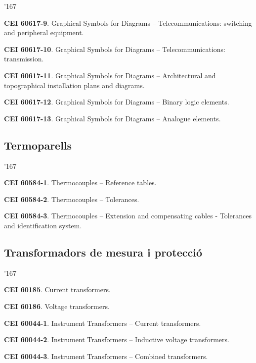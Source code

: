 \begin{dinglist}{'167}
     \item \textbf{CEI 60617-9}. Graphical Symbols for Diagrams -- Telecommunications: switching and peripheral equipment.
      \item \textbf{CEI 60617-10}. Graphical Symbols for Diagrams -- Telecommunications: transmission.
      \item \textbf{CEI 60617-11}. Graphical Symbols for Diagrams -- Architectural and topographical installation plans and diagrams.
      \item \textbf{CEI 60617-12}. Graphical Symbols for Diagrams -- Binary logic elements.
      \item \textbf{CEI 60617-13}. Graphical Symbols for Diagrams -- Analogue elements.
\end{dinglist}


\subsection*{Termoparells} 
\begin{dinglist}{'167}
    \item \textbf{CEI 60584-1}. Thermocouples -- Reference tables.
    \item \textbf{CEI 60584-2}. Thermocouples -- Tolerances.
    \item \textbf{CEI 60584-3}. Thermocouples -- Extension and compensating cables - Tolerances and identification system.
\end{dinglist}


\subsection*{Transformadors de mesura i protecci\'{o}}
\begin{dinglist}{'167}
    \item \textbf{CEI 60185}. Current transformers.
    \item \textbf{CEI 60186}. Voltage transformers.
    \item \textbf{CEI 60044-1}. Instrument Transformers -- Current transformers.
    \item \textbf{CEI 60044-2}. Instrument Transformers -- Inductive voltage transformers.
    \item \textbf{CEI 60044-3}. Instrument Transformers -- Combined transformers.
\end{dinglist}


